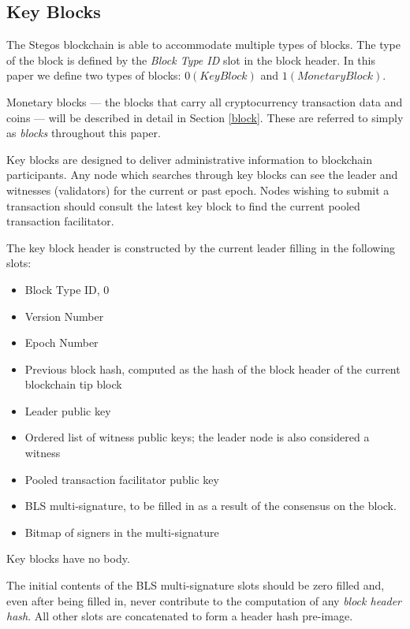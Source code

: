 \documentclass[a4paper, 10pt, conference]{ieeeconf}
\begin{document}
\subsection{Key Blocks}

The Stegos blockchain is able to accommodate multiple types of blocks. The type of the block is defined by the \textit{Block Type ID} slot in the block header. In this paper we define two types of blocks: $0 (KeyBlock)$ and $1 (MonetaryBlock)$.

Monetary blocks --- the blocks that carry all cryptocurrency transaction data and coins --- will be described in detail in Section \ref{block}. These are referred to simply as \textit{blocks} throughout this paper. 

Key blocks are designed to deliver administrative information to blockchain participants. Any node which searches through key blocks can see the leader and witnesses (validators) for the current or past epoch. Nodes wishing to submit a transaction should consult the latest key block to find the current pooled transaction facilitator.

The key block header is constructed by the current leader filling in the following slots:

\begin{itemize}
	\item {Block Type ID, 0}
	\item {Version Number}
	\item {Epoch Number}
	\item {Previous block hash, computed as the hash of the block header of the current blockchain tip block}
	\item {Leader public key}
	\item {Ordered list of witness public keys; the leader node is also considered a witness}
	\item {Pooled transaction facilitator public key}
	\item {BLS multi-signature, to be filled in as a result of the consensus on the block.}
	\item {Bitmap of signers in the multi-signature}
\end{itemize}

Key blocks have no body.

The initial contents of the BLS multi-signature slots should be zero filled and, even after being filled in, never contribute to the computation of any \textit{block header hash}. All other slots are concatenated to form a header hash pre-image.
\end{document}
